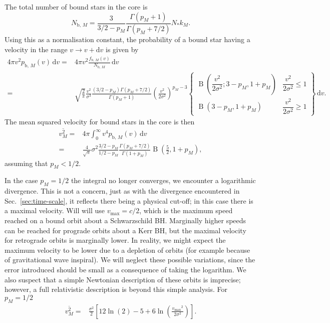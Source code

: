 \documentclass[useAMS,usedcolumn,usegraphicx,usenatbib]{mn2e}
\newcommand{\secref}[1]{Sec.~\ref{sec:#1}}
\DeclareMathOperator{\Beta}{B}
\newcommand{\sub}[1]{\ensuremath{_\mathrm{#1}}}
\newcommand{\dd}{\ensuremath{\mathrm{d}}}
\newcommand{\intd}[4]{\ensuremath{\displaystyle \int_{#1}^{#2}{#3}\,\dd{#4}}}
\begin{document}
\begin{onecolumn}
The total number of bound stars in the core is
\begin{equation}
N_{\mathrm{b},\,M} = \frac{3}{3/2 - p_M}\frac{\Gamma(p_M + 1)}{\Gamma(p_M + 7/2)}N_\ast k_M.
\end{equation}
Using this as a normalisation constant, the probability of a bound star having a velocity in the range $v \rightarrow v + \dd v$ is given by
\begin{align}
4\pi v^2 p_{\mathrm{b},\,M}(v) \,\dd v = {} & 4\pi v^2 \frac{f_{\mathrm{b},\,M}(v)}{N_{\mathrm{b},\,M}} \,\dd v \\
 = {} & \sqrt{\frac{2}{\pi}} \frac{v^2}{\sigma^3} \frac{\left(3/2 - p_M\right)\Gamma(p_M + 7/2)}{\Gamma(p_M + 1)} \left(\frac{v^2}{2\sigma^2}\right)^{p_M - 3}\left\{\begin{array}{lr}
\Beta\left(\dfrac{v^2}{2\sigma^2}; 3 - p_M, 1 + p_M\right) & \dfrac{v^2}{2\sigma^2} \leq 1 \\
\Beta\left(3 - p_M, 1 + p_M\right) & \dfrac{v^2}{2\sigma^2} \geq 1\end{array}\right\}\,\dd v.
\end{align}
The mean squared velocity for bound stars in the core is then
\begin{align}
\overline{v^2_{M}} = {} & 4\pi\intd{0}{\infty}{v^4 p_{\mathrm{b},\,M}(v)}{v} \\
 = {} & \frac{4}{\sqrt{\pi}}\sigma^2\frac{3/2 - p_M}{1/2 - p_M}\frac{\Gamma(p_M + 7/2)}{\Gamma(1 + p_M)}\Beta\left(\frac{5}{2},1 + p_M\right),
\end{align}
assuming that $p_M < 1/2$.

In the case $p_M = 1/2$ the integral no longer converges, we encounter a logarithmic divergence. This is not a concern, just as with the divergence encountered in \secref{time-scale}, it reflects there being a physical cut-off; in this case there is a maximal velocity. Will will use $v\sub{max} = c/2$, which is the maximum speed reached on a bound orbit about a Schwarzschild BH. Marginally higher speeds can be reached for prograde orbits about a Kerr BH, but the maximal velocity for retrograde orbits is marginally lower. In reality, we might expect the maximum velocity to be lower due to a depletion of orbits (for example because of gravitational wave inspiral). We will neglect these possible variations, since the error introduced should be small as a consequence of taking the logarithm. We also suspect that a simple Newtonian description of these orbits is imprecise; however, a full relativistic description is beyond this simple analysis. For $p_M = 1/2$
\begin{align}
\overline{v^2_{M}} = {} & \frac{\sigma^2}{2}\left[12\ln(2) - 5 + 6 \ln\left(\frac{v\sub{max}^2}{2\sigma^2}\right)\right].
\end{align}


\end{onecolumn}
\end{document}
